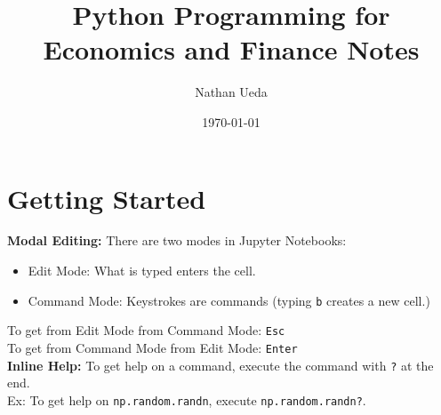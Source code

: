 \documentclass[11pt]{article}
\title{Python Programming for Economics and Finance Notes}
\author{Nathan Ueda}
\date{\today}
\begin{document}
\maketitle 
\pagebreak
\tableofcontents 
\pagebreak

\section{Getting Started}

\textbf{Modal Editing:}
There are two modes in Jupyter Notebooks:

\begin{itemize}
    \item Edit Mode: What is typed enters the cell.
    \item Command Mode: Keystrokes are commands (typing \texttt{b} creates a new cell.)
\end{itemize}

To get from Edit Mode from Command Mode: \texttt{Esc} \\
To get from Command Mode from Edit Mode: \texttt{Enter} \\
 
\textbf{Inline Help:}
To get help on a command, execute the command with \texttt{?} at the end. \\
Ex: To get help on \texttt{np.random.randn}, execute \texttt{np.random.randn?}. \\
\end{document}

